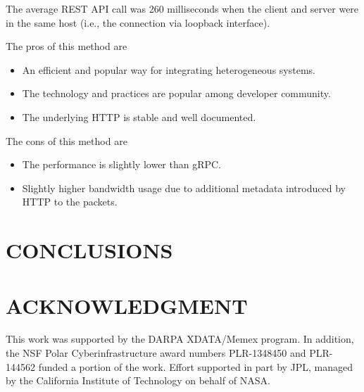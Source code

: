 \documentclass[letterpaper, 10 pt, conference]{ieeeconf}  %
\begin{document}
The average REST API call was 260 milliseconds when the client and server were in the same host (i.e., the connection via loopback interface).

The pros of this method are 
\begin{itemize}
\item An efficient and popular way for integrating heterogeneous systems.
\item The technology and practices are popular among developer community.
\item The underlying HTTP is stable and well documented.
\end{itemize}

The cons of this method are 
\begin{itemize}
\item The performance is slightly lower than gRPC.
\item Slightly higher bandwidth usage due to additional metadata introduced by HTTP to the packets.
\end{itemize}

\section{CONCLUSIONS}

\section*{ACKNOWLEDGMENT}
This work was supported by the DARPA XDATA/Memex program. In addition, the NSF Polar Cyberinfrastructure award numbers PLR-1348450 and PLR-144562 funded a portion of the work. Effort supported in part by JPL, managed by the California Institute of Technology on behalf of NASA.


\end{document}
